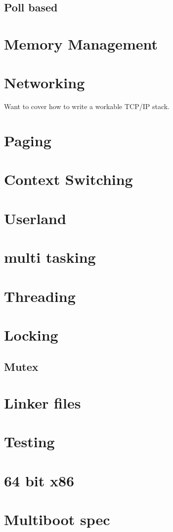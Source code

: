 \documentclass[oneside,english,final]{amsbook}
\begin{document}
\section{Poll based}

\chapter{Memory Management}
\chapter{Networking}
Want to cover how to write a workable TCP/IP stack.
\chapter{Paging}
\chapter{Context Switching}
\chapter{Userland}
\chapter{multi tasking}
\chapter{Threading}
\chapter{Locking}
\section{Mutex}

\chapter{Linker files}
\chapter{Testing}
\chapter{64 bit x86}
\chapter{Multiboot spec}
\end{document}
